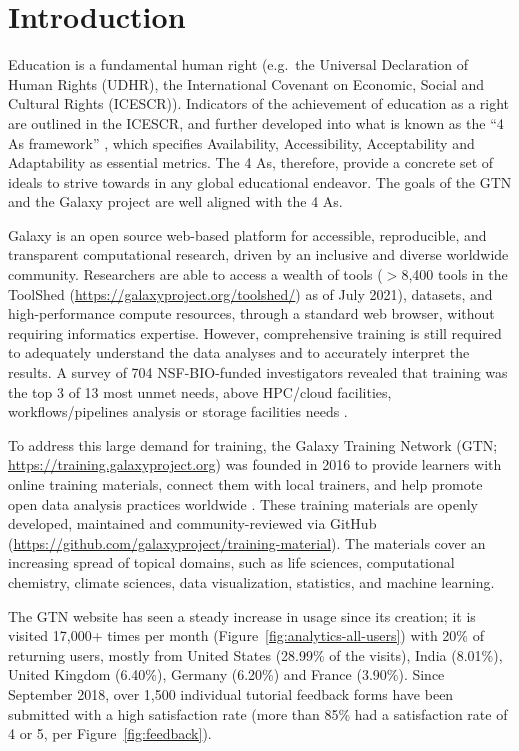 \documentclass[10pt,letterpaper]{article}
\begin{document}

\section*{Introduction}

Education is a fundamental human right (e.g.\ the Universal Declaration of Human Rights (UDHR), the International Covenant on Economic, Social and Cultural Rights (ICESCR)).
Indicators of the achievement of education as a right are outlined in the ICESCR, and further developed into what is known as the “4 As framework” \cite{tomavsevski2001human}, which specifies Availability, Accessibility, Acceptability and Adaptability as essential metrics.
The 4 As, therefore, provide a concrete set of ideals to strive towards in any global educational endeavor.
The goals of the GTN and the Galaxy project are well aligned with the 4 As.

Galaxy \cite{Jalili2020} is an open source web-based platform for accessible, reproducible, and transparent computational research, driven by an inclusive and diverse worldwide community.
Researchers are able to access a wealth of tools ($>$8,400 tools in the ToolShed (\url{https://galaxyproject.org/toolshed/}) as of July 2021), datasets, and high-performance compute resources, through a standard web browser, without requiring informatics expertise. 
However, comprehensive training is still required to adequately understand the data analyses and to accurately interpret the results. A survey of 704 NSF-BIO-funded investigators revealed that training was the top 3 of 13 most unmet needs, above HPC/cloud facilities, workflows/pipelines analysis or storage facilities needs \cite{Barone2017}.

To address this large demand for training, the Galaxy Training Network (GTN; \url{https://training.galaxyproject.org}) was founded in 2016 to provide learners with online training materials, connect them with local trainers, and help promote open data analysis practices worldwide \cite{Batut2018}. These training materials are openly developed, maintained and community-reviewed via GitHub (\url{https://github.com/galaxyproject/training-material}). 
The materials cover an increasing spread of topical domains, such as life sciences, computational chemistry, climate sciences, data visualization, statistics, and machine learning. 

The GTN website has seen a steady increase in usage since its creation; it is visited 17,000+ times per month (Figure~\ref{fig:analytics-all-users}) with 20\% of returning users, mostly from United States (28.99\% of the visits), India (8.01\%), United Kingdom (6.40\%), Germany (6.20\%) and France (3.90\%). Since September 2018, over 1,500 individual tutorial feedback forms have been submitted with a high satisfaction rate (more than 85\% had a satisfaction rate of 4 or 5, per Figure~\ref{fig:feedback}). 
\end{document}
